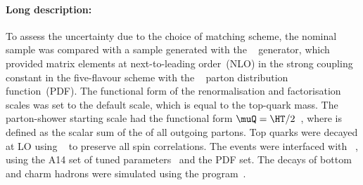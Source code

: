 \paragraph{Long description:}

To assess the uncertainty due to the choice of matching scheme, the nominal sample was compared with a sample generated
with the \MGNLO[2.6.2]~\cite{Alwall:2014hca} generator, which provided matrix elements at next-to-leading order~(NLO) in the strong coupling constant \alphas
in the five-flavour scheme with the \NNPDF[3.0nlo]~\cite{Ball:2014uwa} parton distribution function~(PDF).
The functional form of the renormalisation and factorisation scales was set to the default scale, which is equal to the top-quark mass.
The parton-shower starting scale had the functional form $\muQ = \HT/2$~\cite{ATL-PHYS-PUB-2017-007}, 
where \HT is defined as the scalar sum of the \pT of all outgoing partons.
Top quarks were decayed at LO using \MADSPIN~\cite{Frixione:2007zp,Artoisenet:2012st} to preserve all spin correlations.
The events were interfaced with \PYTHIA[8.230]~\cite{Sjostrand:2014zea}, using the A14 set of tuned parameters~\cite{ATL-PHYS-PUB-2014-021} 
and the \NNPDF[2.3lo] PDF set.
The decays of bottom and charm hadrons were simulated using the \EVTGEN[1.6.0] program~\cite{Lange:2001uf}.
